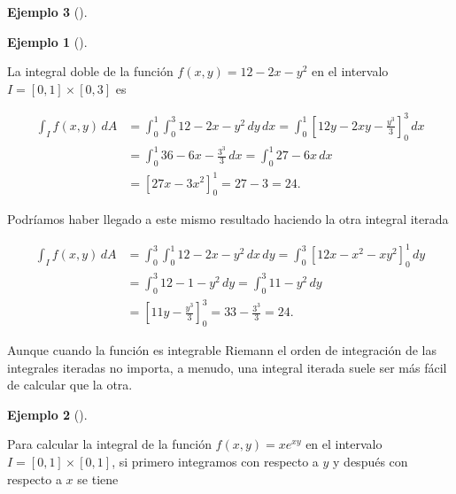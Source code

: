 \documentclass[
  a4paper,
]{scrreport}
\theoremstyle{definition}
\newtheorem{example}{Ejemplo}[chapter]
\theoremstyle{plain}
\theoremstyle{definition}
\theoremstyle{definition}
\theoremstyle{plain}
\theoremstyle{plain}
\theoremstyle{remark}
\begin{document}
\begin{example}[]
\begin{tcolorbox}
\end{tcolorbox}

\begin{example}[]\protect\hypertarget{exm-integrales-iteradas}{}\label{exm-integrales-iteradas}

La integral doble de la función \(f(x,y)=12-2x-y^2\) en el intervalo
\(I=[0,1]\times[0,3]\) es

\begin{align*}
\int_I f(x,y)\, dA 
&= \int_0^1 \int_0^3 12-2x-y^2 \,dy\,dx
= \int_0^1 \left[12y-2xy-\frac{y^3}{3}\right]_0^3\,dx \\
&= \int_0^1 36-6x-\frac{3^3}{3}\, dx
= \int_0^1 27-6x\,dx \\
&= [27x-3x^2]_0^1 
= 27-3
= 24. 
\end{align*}

Podríamos haber llegado a este mismo resultado haciendo la otra integral
iterada

\begin{align*}
\int_I f(x,y)\, dA 
&= \int_0^3 \int_0^1 12-2x-y^2 \,dx\,dy
= \int_0^3 \left[12x-x^2-xy^2\right]_0^1\,dy \\
&= \int_0^3 12-1-y^2\, dy
= \int_0^3 11-y^2\,dy \\
&= \left[11y-\frac{y^3}{3}\right]_0^3 
= 33 - \frac{3^3}{3}
= 24.
\end{align*}

\end{example}

\begin{tcolorbox}[enhanced jigsaw, leftrule=.75mm, colbacktitle=quarto-callout-important-color!10!white, toprule=.15mm, opacityback=0, opacitybacktitle=0.6, toptitle=1mm, breakable, bottomtitle=1mm, colframe=quarto-callout-important-color-frame, rightrule=.15mm, titlerule=0mm, title=\textcolor{quarto-callout-important-color}{\faExclamation}\hspace{0.5em}{Importante}, arc=.35mm, left=2mm, bottomrule=.15mm, colback=white, coltitle=black]

Aunque cuando la función es integrable Riemann el orden de integración
de las integrales iteradas no importa, a menudo, una integral iterada
suele ser más fácil de calcular que la otra.

\end{tcolorbox}

\begin{example}[]\protect\hypertarget{exm-integrales-iteradas-2}{}\label{exm-integrales-iteradas-2}

Para calcular la integral de la función \(f(x,y) = xe^{xy}\) en el
intervalo \(I=[0,1]\times [0,1]\), si primero integramos con respecto a
\(y\) y después con respecto a \(x\) se tiene


\end{example}
\end{example}
\end{document}
